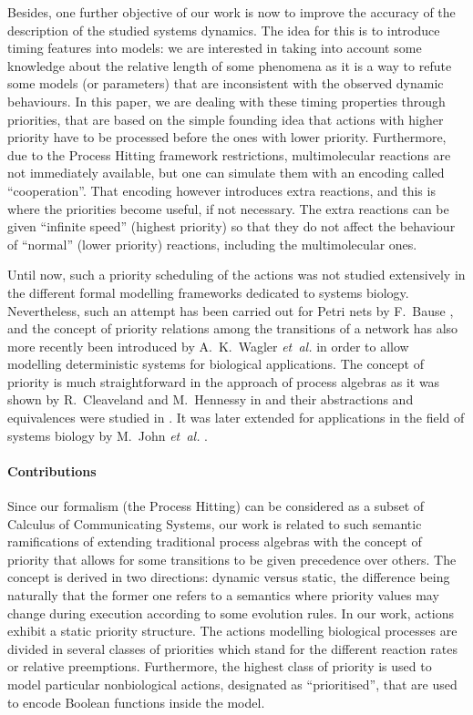 Besides, one further objective of our work is now %
to improve the accuracy of the description of the studied systems dynamics.
The idea for this is to introduce timing features into models:
we are interested in taking into account some knowledge about the relative length of some phenomena as it is a way to refute some models (or parameters) that are inconsistent with the observed dynamic behaviours.
In this paper, we are dealing with these timing properties through priorities,
that are based on the simple founding idea that actions with higher priority have to be processed before the ones with lower priority.
Furthermore, due to the Process Hitting framework restrictions, multimolecular reactions are not immediately available, but one can simulate them with an encoding called “cooperation”.
That encoding however introduces extra reactions, and this is where the priorities become useful, if not necessary.
The extra reactions can be given “infinite speed” (highest priority) so that they do not affect the behaviour of “normal” (lower priority) reactions, including the multimolecular ones.

Until now, such a priority scheduling of the actions was not studied extensively in the different formal modelling frameworks dedicated to systems biology.
Nevertheless, such an attempt has been carried out for Petri nets by F.~Bause \cite{Bause97},
and the concept of priority relations among the transitions of a network has also more recently been introduced by A.~K.~Wagler \textit{et~al.} \cite{waw,WaglerW12} in order to allow modelling deterministic systems for biological applications.
The concept of priority is much straightforward in the approach of process algebras as it was shown by R.~Cleaveland and M.~Hennessy in \cite{Cleaveland199058,Cleaveland99prioritiesin} and their abstractions and equivalences were studied in \cite{Cleaveland:2007:PAP:1282576.1282847}.
It was later extended for applications in the field of systems biology by M.~John \textit{et~al.} \cite{jlnu2010}.

\paragraph{Contributions}
Since our formalism (the Process Hitting) can be considered as a subset of Calculus of Communicating Systems, %
our work is related to such semantic ramifications of extending traditional process algebras with the concept of priority that allows for some transitions to be given precedence over others.
The concept is derived in two directions: dynamic versus static, the difference being naturally that the former one refers to a semantics where priority values may change during execution according to some evolution rules.
In our work, actions exhibit a static priority structure.
The actions modelling biological processes are divided in several classes of priorities which stand for the different reaction rates or relative preemptions.
Furthermore, the highest class of priority is used to model particular nonbiological actions, designated as “prioritised”,
that are used to encode Boolean functions inside the model.


